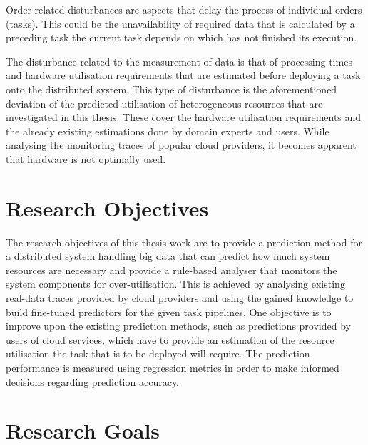             Order-related disturbances are aspects that delay the process of individual orders (tasks).
            This could be the unavailability of required data that is calculated by a preceding task the current task depends on which has not finished its execution.

            The disturbance related to the measurement of data is that of processing times and hardware utilisation requirements that are estimated before deploying a task onto the distributed system. 
            This type of disturbance is the aforementioned deviation of the predicted utilisation of heterogeneous resources that are investigated in this thesis. These cover the hardware utilisation requirements and the already existing estimations done by domain experts and users. While analysing the monitoring traces of popular cloud providers, it becomes apparent that hardware is not optimally used.


        
        \section{Research Objectives}
        \label{sec:research-objectives-introduction}

            The research objectives of this thesis work are to provide a prediction method for a distributed system handling big data that can predict how much system resources are necessary and provide a rule-based analyser that monitors the system components for over-utilisation.
            This is achieved by analysing existing real-data traces provided by cloud providers and using the gained knowledge to build fine-tuned predictors for the given task pipelines. One objective is to improve upon the existing prediction methods, such as predictions provided by users of cloud services, which have to provide an estimation of the resource utilisation the task that is to be deployed will require. 
            The prediction performance is measured using regression metrics in order to make informed decisions regarding prediction accuracy.

        \section{Research Goals}
        \label{sec:goals-results-introduction}

